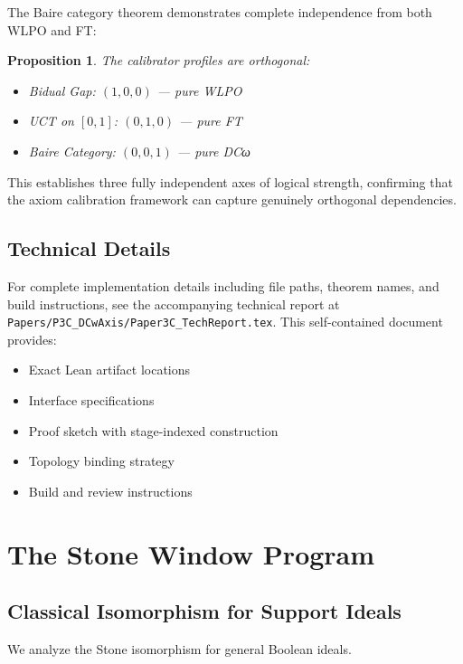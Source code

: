 \documentclass[11pt]{article}
\newtheorem{proposition}[theorem]{Proposition}
\begin{document}
The Baire category theorem demonstrates complete independence from both WLPO and FT:

\begin{proposition}
The calibrator profiles are orthogonal:
\begin{itemize}
\item Bidual Gap: $(1, 0, 0)$ — pure WLPO
\item UCT on $[0,1]$: $(0, 1, 0)$ — pure FT
\item Baire Category: $(0, 0, 1)$ — pure DCω
\end{itemize}
\end{proposition}

This establishes three fully independent axes of logical strength, confirming that the axiom calibration framework can capture genuinely orthogonal dependencies.

\subsection{Technical Details}

For complete implementation details including file paths, theorem names, and build instructions, see the accompanying technical report at \texttt{Papers/P3C\_DCwAxis/Paper3C\_TechReport.tex}. This self-contained document provides:
\begin{itemize}
\item Exact Lean artifact locations
\item Interface specifications  
\item Proof sketch with stage-indexed construction
\item Topology binding strategy
\item Build and review instructions
\end{itemize}

\section{The Stone Window Program}

\subsection{Classical Isomorphism for Support Ideals}

We analyze the Stone isomorphism for general Boolean ideals.
\end{document}
